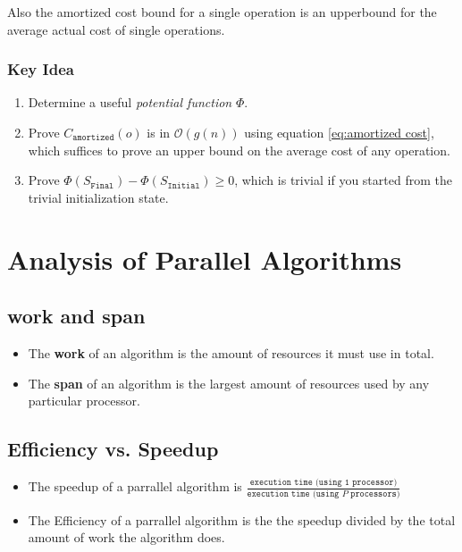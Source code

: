 \documentclass[12pt, letterpaper]{book}
\newcommand{\bigO}{\mathcal{O}}
\begin{document}
Also the amortized cost bound for a single operation is an upperbound for the average actual cost of single operations.

\subsubsection{Key Idea}

\begin{enumerate}
  \item Determine a useful \textit{potential function} $\Phi$.
  \item Prove $C_{\texttt{amortized}}(o)$ is in $\bigO(g(n))$ using equation \ref{eq:amortized cost}, which suffices to prove an upper bound on the average cost of any operation.
  \item Prove $\Phi(S_{\texttt{Final}}) - \Phi(S_{\texttt{Initial}}) \ge 0$, which is trivial if you started from the trivial initialization state.
\end{enumerate}

\section{Analysis of Parallel Algorithms} \label{parallel analysis}

\subsection{work and span}

\begin{itemize}
  \item The \textbf{work} of an algorithm is the amount of resources it must use in total.
  \item The \textbf{span} of an algorithm is the largest amount of resources used by any particular processor.
\end{itemize}

\subsection{Efficiency vs. Speedup}

\begin{itemize}
  \item The speedup of a parrallel algorithm is $\frac{\texttt{execution time (using 1 processor)}}{\texttt{execution time (using $P$ processors)}}$
  \item The Efficiency of a parrallel algorithm is the the speedup divided by the total amount of work the algorithm does.
\end{itemize}
\end{document}
